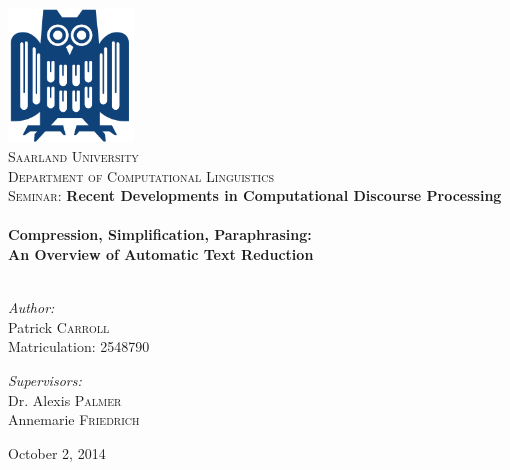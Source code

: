 \begin{titlepage}
\begin{center}

\includegraphics[width=0.25\textwidth]{./eule}~\\[1cm]

\textsc{\LARGE Saarland  University}\\[0.4cm]
\textsc{\Large Department of Computational Linguistics}\\[1.5cm]

\textsc{\Large Seminar:} \textbf{\Large Recent Developments in Computational Discourse Processing}\\[0.5cm]

\HRule \\[1.0cm]

{ \Large \bfseries Compression, Simplification, Paraphrasing:}\\[0.4cm]
{ \bfseries An Overview of Automatic Text Reduction}\\[0.3cm]

\HRule \\[1.5cm]

\begin{minipage}{0.4\textwidth}
\begin{flushleft} \large
\emph{Author:}\\
Patrick \textsc{Carroll}\\
Matriculation: 2548790
\end{flushleft}
\end{minipage}
\begin{minipage}{0.4\textwidth}
\begin{flushright} \large
\emph{Supervisors:} \\
Dr. Alexis \textsc{Palmer}\\
Annemarie \textsc{Friedrich}\\
\end{flushright}
\end{minipage}

\vfill

{\large October 2, 2014}

\end{center}
\end{titlepage}
